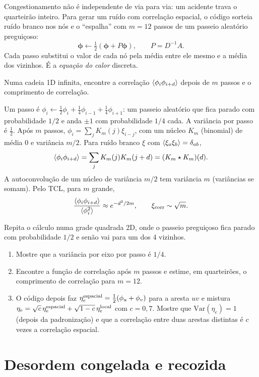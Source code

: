 \documentclass[11pt]{article}
\begin{document}
Congestionamento não é independente de via para via: um acidente trava o quarteirão inteiro. Para gerar um ruído com correlação espacial, o código sorteia ruído branco nos nós e o ``espalha'' com $m=12$ passos de um passeio aleatório preguiçoso:
\[
\bm\phi\leftarrow\tfrac12\left(\bm\phi + P\bm\phi\right),\qquad P = D^{-1}A.
\]
Cada passo substitui o valor de cada nó pela média entre ele mesmo e a média dos vizinhos. É a \emph{equação do calor} discreta.

\begin{exemplo}
Numa cadeia 1D infinita, encontre a correlação $\left\langle \phi_i\phi_{i+d} \right\rangle$ depois de $m$ passos e o comprimento de correlação.
\end{exemplo}
\begin{solucao}
Um passo é $\phi_i\leftarrow\tfrac12\phi_i+\tfrac14\phi_{i-1}+\tfrac14\phi_{i+1}$: um passeio aleatório que fica parado com probabilidade $1/2$ e anda $\pm1$ com probabilidade $1/4$ cada. A variância por passo é $\tfrac12$. Após $m$ passos, $\phi_i = \sum_j K_m(j)\xi_{i-j}$, com um núcleo $K_m$ (binomial) de média 0 e variância $m/2$. Para ruído branco $\xi$ com $\left\langle \xi_a\xi_b \right\rangle=\delta_{ab}$,
\[
\left\langle \phi_i\phi_{i+d} \right\rangle = \sum_j K_m(j)K_m(j+d) = (K_m\star K_m)(d).
\]
A autoconvolução de um núcleo de variância $m/2$ tem variância $m$ (variâncias se somam). Pelo TCL, para $m$ grande,
\[
\frac{\left\langle \phi_i\phi_{i+d} \right\rangle}{\left\langle \phi_i^2 \right\rangle}\approx e^{-d^2/2m},\qquad \xi_{\rm corr}\sim\sqrt m.
\]
\end{solucao}

 Repita o cálculo numa grade quadrada 2D, onde o passeio preguiçoso fica parado com probabilidade $1/2$ e senão vai para um dos 4 vizinhos.
\begin{enumerate}
  \item Mostre que a variância por eixo por passo é $1/4$.
  \item Encontre a função de correlação após $m$ passos e estime, em quarteirões, o comprimento de correlação para $m=12$.
  \item O código depois faz $\eta_e^{\rm espacial} = \tfrac12(\phi_u+\phi_v)$ para a aresta $uv$ e mistura $\eta_e = \sqrt c\,\eta^{\rm espacial}_e+\sqrt{1-c}\,\eta^{\rm local}_e$ com $c=0{,}7$. Mostre que $\mathrm{Var}(\eta_e)=1$ (depois da padronização) e que a correlação entre duas arestas distintas é $c$ vezes a correlação espacial.
\end{enumerate}

\section{Desordem congelada e recozida}
\end{document}
